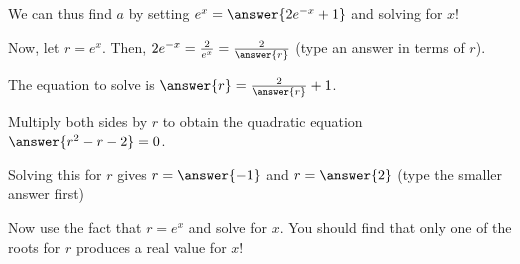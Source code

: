 \documentclass{ximera}
\begin{document}
\begin{exercise}
\begin{hint}
\begin{image}
	\end{image}
	\end{hint}
	
We can thus find $a$ by setting $e^x = \answer{2e^{-x}+1}$ and solving for $x$!

Now, let $r=e^x$.  Then, $2e^{-x} = \frac{2}{e^x} = \frac{2}{\answer{r}}$ (type an answer in terms of $r$).

The equation to solve is $\answer{r}=\frac{2}{\answer{r}}+1$.	

Multiply both sides by $r$ to obtain the quadratic equation $\answer{r^2-r-2}=0$.  

Solving this for $r$ gives $r=\answer{-1}$ and $r=\answer{2}$ (type the smaller answer first)

Now use the fact that $r=e^x$ and solve for $x$.  You should find that only one of the roots for $r$ produces a real value for $x$!
	
\end{exercise}
\end{document}
